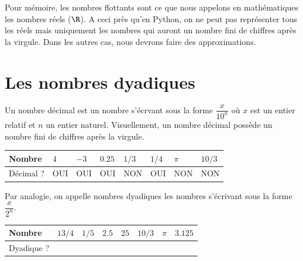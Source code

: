 \def\level{Première}  %
\def\course{NSI}
\def\chaptername{Représentation des flottants} %
\def\docname{RD04}        %

\pagestyle{cours_FP}
\makeheader{} %


Pour mémoire, les nombres flottants sont ce que nous appelons en mathématiques les nombres réels ($\R$). A ceci près qu'en Python, on ne peut pas représenter tous les réels mais uniquement les nombres qui auront un nombre fini de chiffres après la virgule. Dans les autres cas, nous devrons faire des approximations.



\section{Les nombres dyadiques}



\begin{definition}{}


Un nombre décimal est un nombre s'écrvant sous la forme $\dfrac{x}{10^n}$ où $x$ est un entier relatif et $n$ un entier naturel. Visuellement, un nombre décimal possède un nombre fini de chiffres après la virgule.
\end{definition}

\renewcommand{\arraystretch}{1.4}
\begin{tabular}{|p{3cm}|p{1cm}|p{1cm}|p{1cm}|p{1cm}|p{1cm}|p{1cm}|p{1cm}|}
\hline
Nombre & $4$ & $-3$ & $0.25$ & $1/3$ & $1/4$ & $\pi$ & $10/3$ \\ \hline
Décimal ? & OUI & OUI & OUI & NON & OUI & NON & NON \\ \hline
\end{tabular}


\begin{definition}{}
	
	Par analogie, on appelle nombres dyadiques les nombres s'écrivant sous la forme $\dfrac{x}{2^n}$.
\end{definition}

\begin{exercice_cours}{}

\begin{tabular}{|p{3cm}|p{1cm}|p{1cm}|p{1cm}|p{1cm}|p{1cm}|p{1cm}|p{1cm}|}
\hline
Nombre & $13/4$ & $1/5$ & $2.5$ & $25$ & $10/3$ & $\pi$ & $3.125$ \\ \hline
Dyadique ? &  &  &  &  &  &  &  \\ \hline
\end{tabular}
\end{exercice_cours}

